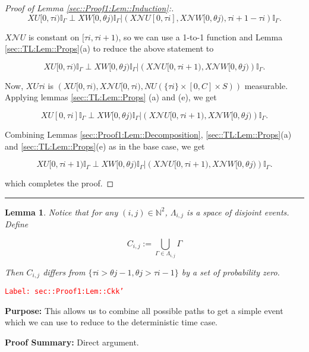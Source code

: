 \documentclass[12pt]{article}
\newcommand{\mb}{\mathbb}
\newcommand{\mc}{\mathcal}
\newcommand{\tr}{\textcolor{red}}
\newcommand{\labe}[1]{\tr{\texttt{Label: #1}}}
\newcommand{\purpose}{\textbf{Purpose: }}
\newcommand{\pfsum}{\textbf{Proof Summary: }}
\newcommand{\lin}{\rule{\linewidth}{0.4 pt}}
\renewcommand{\U}{U}							%
\newcommand{\UU}{W}								%
\renewcommand{\S}{S}							%
\newcommand{\X}{X}								%
\newcommand{\neigh}{\mc{N}}						%
\newcommand{\const}{C}							%
\newcommand{\poiss}{N}							%
\newcommand{\rt}{\tau}							%
\newcommand{\rtt}{\theta}						%
\newcommand{\apath}{\Gamma}						%
\newcommand{\pathset}[2]{\Lambda_{#1,#2}}		%
\newcommand{\pathsete}[2]{C_{#1,#2}}			%
\newtheorem{lem}[thms]{Lemma}
\begin{document}
\begin{proof}[Proof of Lemma \ref{sec::Proof1:Lem::Induction}:]
\[\X{\U}{[0,\rt{i})}\mb{I}_{\apath{}}\perp \X{\UU}{[0,\rtt{j})}\mb{I}_{\apath{}}|\left(\X{\neigh{\U}}{[0,\rt{i}]},\X{\neigh{\UU}}{[0,\rtt{j})},\rt{i+1} - \rt{i}\right)\mb{I}_{\apath{}}.\]

\(\X{\neigh{\U}}{}\) is constant on \([\rt{i},\rt{i+1})\), so we can use a 1-to-1 function and Lemma \ref{sec::TL:Lem::Props}(a) to reduce the above statement to

\[\X{\U}{[0,\rt{i})}\mb{I}_{\apath{}}\perp \X{\UU}{[0,\rtt{j})}\mb{I}_{\apath{}}|\left(\X{\neigh{\U}}{[0,\rt{i+1})},\X{\neigh{\UU}}{[0,\rtt{j})}\right)\mb{I}_{\apath{}}.\]

Now, \(\X{\U}{\rt{i}}\) is \(\left(\X{\U}{[0,\rt{i})}, \X{\neigh{\U}}{[0,\rt{i})}, \poiss{\U}(\{\rt{i}\}\times [0,\const{}]\times\S)\right)\) measurable. Applying lemmas \ref{sec::TL:Lem::Props} (a) and (e), we get

\[\X{\U}{[0,\rt{i}]}\mb{I}_{\apath{}}\perp \X{\UU}{[0,\rtt{j})}\mb{I}_{\apath{}}|\left(\X{\neigh{\U}}{[0,\rt{i+1})},\X{\neigh{\UU}}{[0,\rtt{j})}\right)\mb{I}_{\apath{}}.\]

Combining Lemmas \ref{sec::Proof1:Lem::Decomposition}, \ref{sec::TL:Lem::Props}(a) and \ref{sec::TL:Lem::Props}(e) as in the base case, we get

\[\X{\U}{[0,\rt{i+1})}\mb{I}_{\apath{}}\perp \X{\UU}{[0,\rtt{j})}\mb{I}_{\apath{}}|\left(\X{\neigh{\U}}{[0,\rt{i+1})},\X{\neigh{\UU}}{[0,\rtt{j})}\right)\mb{I}_{\apath{}}.\]

which completes the proof.
\end{proof}

\lin

\begin{lem}
Notice that for any \((i,j) \in \mb{N}^2\), \(\pathset{i}{j}\) is a space of disjoint events. Define

\[\pathsete{i}{j} := \bigcup_{\apath{}\in\pathset{i}{j}} \apath{}\]

Then \(\pathsete{i}{j}\) differs from \(\{\rt{i} > \rtt{j-1}, \rtt{j} > \rt{i-1}\}\) by a set of probability zero.
\label{sec::Proof1:Lem::Ckk'}
\end{lem}
\labe{sec::Proof1:Lem::Ckk'}

\purpose This allows us to combine all possible paths to get a simple event which we can use to reduce to the deterministic time case.

\pfsum Direct argument.
\end{document}
